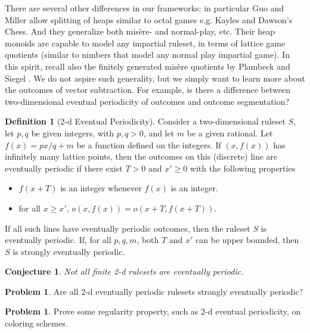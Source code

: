 \documentclass{amsart}
\theoremstyle{plain}
\newtheorem{conj}[thm]{Conjecture}
\theoremstyle{definition}
\newtheorem{defi}[thm]{Definition}
\newtheorem{problem}[thm]{Problem}
\renewcommand{\ge}{\geqslant}
\begin{document}
There are several other differences in our frameworks; in particular Guo and Miller \cite{guo2011lattice} allow splitting of heaps similar to octal games e.g. {\sc Kayles} and {\sc Dawson's Chess}. 
And they generalize both mis\`ere-  and normal-play, etc. Their heap monoids are capable to model any impartial ruleset, in terms of lattice game quotients (similar to nimbers that model any normal play impartial game). In this spirit, recall also the finitely generated mis\`ere quotients by Plambeck and Siegel \cite{PlambeckSiegel2008}. We do not aspire such generality, but we simply want to learn more about the outcomes of  {\sc vector subtraction}. For example, is there a difference between two-dimensional eventual periodicity of outcomes and outcome segmentation? 

 \begin{defi}[2-d Eventual Periodicity]\label{def:2devper}
 \label{def:halflineperiodicity}
 Consider a two-dimensional ruleset $S$, let $p,q$ be given integers, with $p,q>0$, and let $m$ be a given rational. Let $f(x)=px/q+m$ be a function defined on the integers. If $(x, f(x))$ has infinitely many lattice points, then the outcomes on this (discrete) line are eventually  periodic if  there exist  $T >0$ and   $x'\ge 0$ with the following properties 
 \begin{itemize}
\item  $f(x+T)$ is an integer whenever $f(x)$ is an integer.  
\item for all $x\ge x'$, $o(x,f(x)) = o(x+T, f(x+T))$.
\end{itemize}
     If all such lines have eventually periodic outcomes, then the ruleset $S$ is eventually periodic.  If, for all $p,q,m$, both $T$ and $x'$ can be upper bounded, then $S$ is strongly eventually periodic.
\end{defi}

\begin{conj}
\label{conj:periodic}
Not all finite 2-d rulesets are eventually periodic.
\end{conj}


\begin{problem}
\label{Prob:regularitystrong}
    Are all 2-d eventually periodic rulesets strongly eventually periodic?
\end{problem}

 
\begin{problem}
\label{Prob:regularityprop}
    Prove some regularity property, such as 2-d eventual periodicity, on coloring schemes.
\end{problem}
\end{document}
